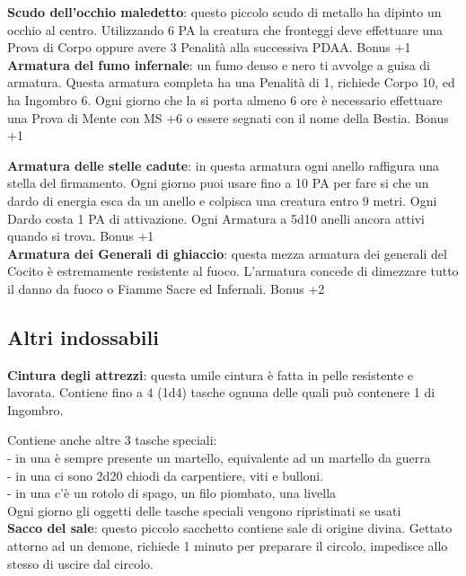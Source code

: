 \documentclass[12pt,a4paper,twoside,openany]{book}
\begin{document}
\begin{multicols}{2}
\textbf{Scudo dell'occhio maledetto}: questo piccolo scudo di metallo ha dipinto un occhio al centro. Utilizzando 6 PA la creatura che fronteggi deve effettuare una Prova di Corpo oppure avere 3 Penalità alla successiva PDAA. Bonus +1\\

\textbf{Armatura del fumo infernale}: un fumo denso e nero ti avvolge a guisa di armatura. Questa armatura completa ha una Penalità di 1, richiede Corpo 10, ed ha Ingombro 6. Ogni giorno che la si porta almeno 6 ore è necessario effettuare una Prova di Mente con MS +6 o essere segnati con il nome della Bestia. Bonus +1

\textbf{Armatura delle stelle cadute}: in questa armatura ogni anello raffigura una stella del firmamento. Ogni giorno puoi usare fino a 10 PA per fare si che un dardo di energia esca da un anello e colpisca una creatura entro 9 metri. Ogni Dardo costa 1 PA di attivazione. Ogni Armatura a 5d10 anelli ancora attivi quando si trova. Bonus +1\\

\textbf{Armatura dei Generali di ghiaccio}: questa mezza armatura dei generali del Cocito è estremamente resistente al fuoco. L'armatura concede di dimezzare tutto il danno da fuoco o Fiamme Sacre ed Infernali. Bonus +2

\subsection{Altri indossabili}
\textbf{Cintura degli attrezzi}: questa umile cintura è fatta in pelle resistente e lavorata. Contiene fino a 4 (1d4) tasche ognuna delle quali può contenere 1 di Ingombro.

Contiene anche altre 3 tasche speciali:\\
- in una è sempre presente un martello, equivalente ad un martello da guerra\\
- in una ci sono 2d20 chiodi da carpentiere, viti e bulloni. \\
- in una c'è un rotolo di spago, un filo piombato, una livella\\
Ogni giorno gli oggetti delle tasche speciali vengono ripristinati se usati\\

\textbf{Sacco del sale}: questo piccolo sacchetto contiene sale di origine divina. Gettato attorno ad un demone, richiede 1 minuto per preparare il circolo, impedisce allo stesso di uscire dal circolo.\\


\end{multicols}
\end{document}
